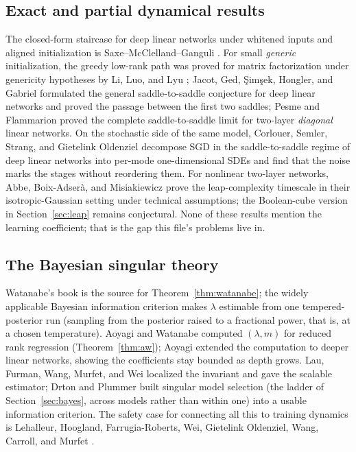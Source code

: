 \documentclass[11pt]{amsart}
\theoremstyle{plain}
\theoremstyle{definition}
\begin{document}
\subsection*{Exact and partial dynamical results}
The closed-form staircase for deep linear networks under whitened inputs and aligned initialization is Saxe--McClelland--Ganguli \cite{saxe2014}. For small \emph{generic} initialization, the greedy low-rank path was proved for matrix factorization under genericity hypotheses by Li, Luo, and Lyu \cite{lilylyu2021}; Jacot, Ged, \c{S}im\c{s}ek, Hongler, and Gabriel \cite{jacot2021} formulated the general saddle-to-saddle conjecture for deep linear networks and proved the passage between the first two saddles; Pesme and Flammarion \cite{pesme2023} proved the complete saddle-to-saddle limit for two-layer \emph{diagonal} linear networks. On the stochastic side of the same model, Corlouer, Semler, Strang, and Gietelink Oldenziel \cite{corlouer2026} decompose SGD in the saddle-to-saddle regime of deep linear networks into per-mode one-dimensional SDEs and find that the noise marks the stages without reordering them. For nonlinear two-layer networks, Abbe, Boix-Adser\`a, and Misiakiewicz \cite{abbe2023} prove the leap-complexity timescale in their isotropic-Gaussian setting under technical assumptions; the Boolean-cube version in Section~\ref{sec:leap} remains conjectural. None of these results mention the learning coefficient; that is the gap this file's problems live in.

\subsection*{The Bayesian singular theory}
Watanabe's book \cite{watanabe2009} is the source for Theorem~\ref{thm:watanabe}; the widely applicable Bayesian information criterion \cite{watanabe2013} makes $\lambda$ estimable from one tempered-posterior run (sampling from the posterior raised to a fractional power, that is, at a chosen temperature). Aoyagi and Watanabe \cite{aoyagi2005} computed $(\lambda, m)$ for reduced rank regression (Theorem~\ref{thm:aw}); Aoyagi \cite{aoyagi2024} extended the computation to deeper linear networks, showing the coefficients stay bounded as depth grows. Lau, Furman, Wang, Murfet, and Wei \cite{lau2023} localized the invariant and gave the scalable estimator; Drton and Plummer \cite{drton2017} built singular model selection (the ladder of Section~\ref{sec:bayes}, across models rather than within one) into a usable information criterion. The safety case for connecting all this to training dynamics is Lehalleur, Hoogland, Farrugia-Roberts, Wei, Gietelink Oldenziel, Wang, Carroll, and Murfet \cite{lehalleur2025}.
\end{document}
